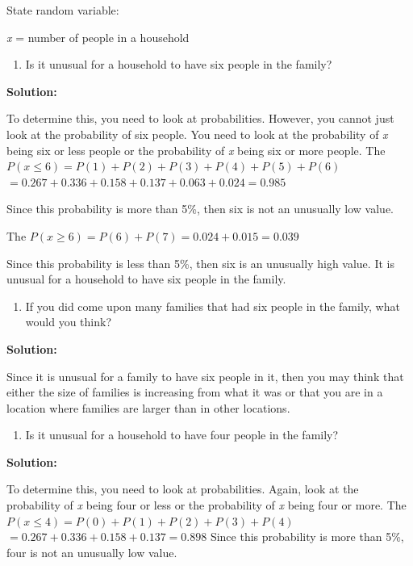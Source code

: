 \documentclass[]{book}
\providecommand{\tightlist}{%
  \setlength{\itemsep}{0pt}\setlength{\parskip}{0pt}}
\begin{document}
State random variable:

\emph{x} = number of people in a household

\begin{enumerate}
\def\labelenumi{\alph{enumi}.}
\tightlist
\item
  Is it unusual for a household to have six people in the family?
\end{enumerate}

\textbf{Solution:}

To determine this, you need to look at probabilities. However, you cannot just look at the probability of six people. You need to look at the probability of \emph{x} being six or less people or the probability of \emph{x} being six or more people. The \(P(x \le 6)=P(1)+P(2)+P(3)+P(4)+P(5)+P(6)\)
\(=0.267+0.336+0.158+0.137+0.063+0.024=0.985\)

Since this probability is more than 5\%, then six is not an unusually low value.

The \(P(x \ge 6)=P(6)+P(7)=0.024+0.015=0.039\)

Since this probability is less than 5\%, then six is an unusually high value. It is unusual for a household to have six people in the family.

\begin{enumerate}
\def\labelenumi{\alph{enumi}.}
\setcounter{enumi}{1}
\tightlist
\item
  If you did come upon many families that had six people in the family, what would you think?
\end{enumerate}

\textbf{Solution:}

Since it is unusual for a family to have six people in it, then you may think that either the size of families is increasing from what it was or that you are in a location where families are larger than in other locations.

\begin{enumerate}
\def\labelenumi{\alph{enumi}.}
\setcounter{enumi}{2}
\tightlist
\item
  Is it unusual for a household to have four people in the family?
\end{enumerate}

\textbf{Solution:}

To determine this, you need to look at probabilities. Again, look at the probability of \emph{x} being four or less or the probability of \emph{x} being four or more. The \(P(x \le 4)=P(0)+P(1)+P(2)+P(3)+P(4)\)
\(=0.267+0.336+0.158+0.137=0.898\)
Since this probability is more than 5\%, four is not an unusually low value.
\end{document}
